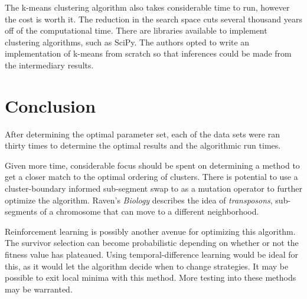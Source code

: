 \documentclass[12pt,twocolumn,oneside]{osajnl}
\begin{document}
The k-means clustering algorithm also takes considerable time to run, however the cost is worth it. The reduction in the search space cuts several thousand years off of the computational time. There are libraries available to implement clustering algorithms, such as SciPy. The authors opted to write an implementation of k-means from scratch so that inferences could be made from the intermediary results.

\section{Conclusion}
After determining the optimal parameter set, each of the data sets were ran thirty times to determine the optimal results and the algorithmic run times. 


Given more time, considerable focus should be spent on determining a method to get a closer match to the optimal ordering of clusters. There is potential to use a cluster-boundary informed sub-segment swap to as a mutation operator to further optimize the algorithm. Raven's \textit{Biology}\cite{raven2001biology} describes the idea of \textit{transposons}, sub-segments of a chromosome that can move to a different neighborhood.

Reinforcement learning is possibly another avenue for optimizing this algorithm. The survivor selection can become probabilistic depending on whether or not the fitness value has plateaued. Using temporal-difference learning would be ideal for this, as it would let the algorithm decide when to change strategies. It may be possible to exit local minima with this method. More testing into these methods may be warranted.

\bigskip




\end{document}
